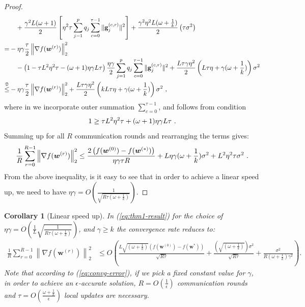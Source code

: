 \documentclass[sigconf, anonymous, review]{acmart}
\newtheorem{corollary}{Corollary}
\begin{document}
\begin{proof}
\begin{align}
     &\quad+\frac{\gamma^2 L(\omega+1)}{2}\left[{\eta^2\tau}\sum_{j=1}^pq_j\sum_{c=0}^{\tau-1}\|\mathbf{g}^{(c,r)}_{j}\|^2\right]+\frac{\gamma^2\eta^2 L(\omega+\frac{1}{k})}{2}\left(\tau \sigma^2\right)\nonumber\\
     =&-\eta\gamma\frac{\tau}{2}\left\|\nabla f({\boldsymbol{w}}^{(r)})\right\|_2^2\nonumber\\
     &\quad-\left(1-{\tau L^2\eta^2\tau}-{(\omega+1)\eta\gamma L}{\tau}\right)\frac{\eta\gamma}{2}\sum_{j=1}^pq_j\sum_{c=0}^{\tau-1}\|\mathbf{g}^{(c,r)}_{j}\|^2+\frac{L\tau\gamma\eta^2 }{2}\left(L\tau\eta+\gamma(\omega+\frac{1}{k})\right)\sigma^2\nonumber\\
     \stackrel{\text{\ding{193}}}{\leq}& -\eta\gamma\frac{\tau}{2}\left\|\nabla f({\boldsymbol{w}}^{(r)})\right\|_2^2+\frac{L\tau\gamma\eta^2 }{2}\left(kL\tau\eta+\gamma(\omega+\frac{1}{k})\right)\sigma^2 \ ,  \label{eq:finalll}
\end{align}
where in  we incorporate outer summation $\sum_{c=0}^{\tau-1}$, and   follows from condition 
\begin{align}\notag
   1\geq {\tau L^2\eta^2\tau}+({\omega}+1)\eta\gamma L{\tau} \ . 
\end{align}
Summing up for all $R$ communication rounds and  rearranging the terms gives:
\begin{align}\notag
    \frac{1}{R}\sum_{r=0}^{R-1}\left\|\nabla f({\boldsymbol{w}}^{(r)})\right\|_2^2\leq \frac{2\left(f(\boldsymbol{w}^{(0)})-f(\boldsymbol{w}^{(*)})\right)}{\eta\gamma\tau R}+{L\eta\gamma{(\omega+\frac{1}{k})}}\sigma^2+{L^2\eta^2\tau }\sigma^2 \ . 
\end{align}
From the above inequality, is it easy to see that in order to achieve a linear speed up, we need to have $\eta\gamma=O\left(\frac{1}{\sqrt{R \tau\left(\omega+\frac{1}{k}\right)}}\right)$.
\end{proof}


\begin{corollary}[Linear speed up] 
In (\ref{eq:thm1-result}) for the choice of  $\eta\gamma=O\left(\frac{1}{L}\sqrt{\frac{1}{R\tau\left(\omega+\frac{1}{k}\right)}}\right)$, and $\gamma\geq k$  the  convergence rate reduces to:
\begin{align}
    \frac{1}{R}\sum_{r=0}^{R-1}\left\|\nabla f({\boldsymbol{w}}^{(r)})\right\|_2^2&\leq O\left(\frac{L\sqrt{\left(\omega+\frac{1}{k}\right)}\left(f(\boldsymbol{w}^{(0)})-f(\boldsymbol{w}^{*})\right)}{\sqrt{R\tau}}+\frac{\left(\sqrt{\left(\omega+\frac{1}{k}\right)}\right)\sigma^2}{\sqrt{R\tau}}+\frac{\sigma^2}{R\left(\omega+\frac{1}{k}\right)\gamma^2}\right).\label{eq:convg-error}
\end{align}
Note that according to (\ref{eq:convg-error}), if we pick  a fixed constant value for  $\gamma$, in order to achieve an $\epsilon$-accurate solution, $R=O\left(\frac{1}{\epsilon}\right)$ communication rounds and $\tau=O\left(\frac{\omega+\frac{1}{k}}{\epsilon}\right)$ local updates are necessary. %
\end{corollary}
\end{document}
